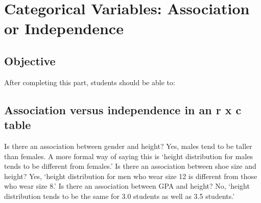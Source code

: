 \documentclass[11pt, chapterprefix=true]{scrbook}\usepackage[]{graphicx}\usepackage[]{color}
\begin{document}
\onecolumn












\chapter{Categorical Variables: Association or Independence}
\label{chap:ch12}

\section{Objective}

After completing this part, students should be able to:


\section{Association versus independence in an r x c table}  

Is there an association between gender and height?  Yes, males tend to be taller than females.  A more formal way of saying this is `height distribution for males tends to be different from females.'   Is there an association between shoe size and height?  Yes,  `height distribution for men who wear size 12 is different from those who wear size 8.'    Is there an association between GPA and height?  No, `height distribution tends to be the same for 3.0 students as well as 3.5 students.'
\end{document}
